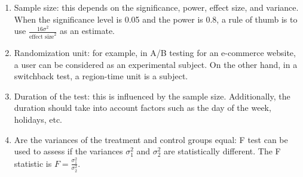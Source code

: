             \begin{enumerate}
                \item Sample size: this depends on the significance, power, effect size, and variance. When the significance level is 0.05 and the power is 0.8, a rule of thumb is to use $\frac{16 \sigma^2}{\text{effect size}^2}$ as an estimate.

                \item Randomization unit: for example, in A/B testing for an e-commerce website, a user can be considered as an experimental subject. On the other hand, in a switchback test, a region-time unit is a subject.
                
                \item Duration of the test: this is influenced by the sample size. Additionally, the duration should take into account factors such as the day of the week, holidays, etc.

                \item Are the variances of the treatment and control groups equal: F test can be used to assess if the variances $\sigma_1^2$ and $\sigma_2^2$ are statistically different. The F statistic is $F = \frac{\sigma_1^2}{\sigma_2^2}$.
                

\end{enumerate}
